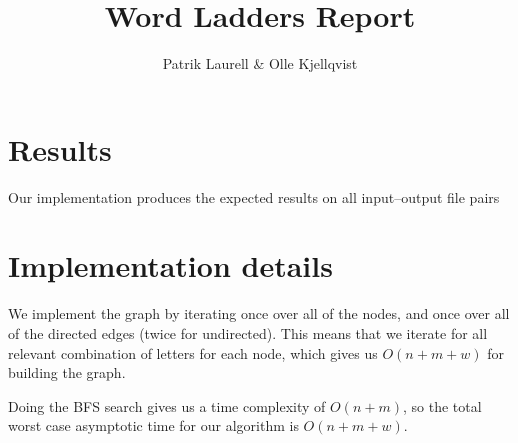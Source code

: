 \documentclass{tufte-handout}
\title{Word Ladders Report}
\author{Patrik Laurell \& Olle Kjellqvist}
\begin{document}
  \maketitle

  \section{Results}

  Our implementation produces the expected results on all input--output file pairs
  \section{Implementation details}

We implement the graph by iterating once over all of the nodes, and once over all of the directed edges (twice for undirected). This means that we iterate for all relevant combination of letters for each node, which gives us $O(n + m + w)$ for building the graph. 

Doing the BFS search gives us a time complexity of $O(n + m)$, so the total worst case asymptotic time for our algorithm is $O(n+m+w)$.
\end{document}
